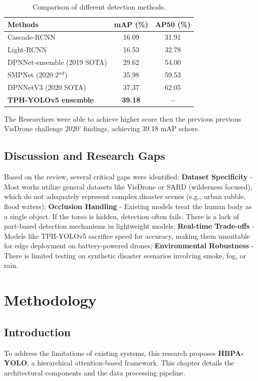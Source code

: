 \documentclass[12pt, a4paper]{report}
\begin{document}
\begin{table}[h!]
\centering
\caption{Comparison of different detection methods.}
\begin{tabular}{lcc}
\hline
\textbf{Methods} & \textbf{mAP (\%)} & \textbf{AP50 (\%)} \\
\hline
Cascade-RCNN & 16.09 & 31.91 \\
Light-RCNN & 16.53 & 32.78 \\
\hline
DPNNet-ensemble (2019 SOTA) & 29.62 & 54.00 \\
SMPNet (2020 2$^{nd}$) & 35.98 & 59.53 \\
DPNNetV3 (2020 SOTA) & 37.37 & 62.05 \\
\textbf{TPH-YOLOv5 ensemble} & \textbf{39.18} & \textbf{--} \\
\hline
\end{tabular}
\end{table}
The Researchers were able to achieve higher score then the previous previous VisDrone challenge 2020' findings, achieving 39.18 mAP schore.

\section{Discussion and Research Gaps}
Based on the review, several critical gaps were identified: \textbf{Dataset Specificity} - Most works utilize general datasets like VisDrone or SARD (wilderness focused), which do not adequately represent complex disaster scenes (e.g., urban rubble, flood waters); \textbf{Occlusion Handling} - Existing models treat the human body as a single object. If the torso is hidden, detection often fails. There is a lack of part-based detection mechanisms in lightweight models; \textbf{Real-time Trade-offs} - Models like TPH-YOLOv5 sacrifice speed for accuracy, making them unsuitable for edge deployment on battery-powered drones; \textbf{Environmental Robustness} - There is limited testing on synthetic disaster scenarios involving smoke, fog, or rain.

\chapter{Methodology}

\section{Introduction}
To address the limitations of existing systems, this research proposes \textbf{HBPA-YOLO}, a hierarchical attention-based framework. This chapter details the architectural components and the data processing pipeline.
\end{document}
